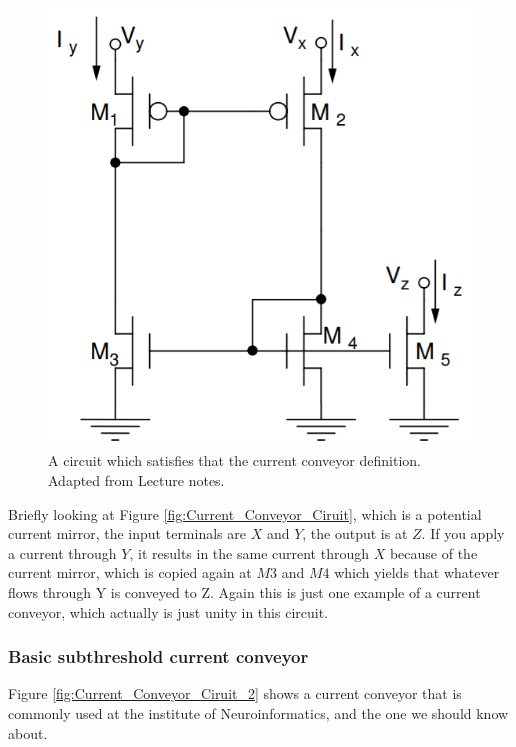 \begin{figure}[H]
    \centering
    \includegraphics[width=0.8\linewidth]{../../Figures/Current_Conveyor_Circuit.PNG}
    \caption{A circuit which satisfies that the current conveyor definition. Adapted from Lecture notes.}
    \label{fig:Current_Conveyor_Circuit}
\end{figure}

Briefly looking at Figure \ref{fig:Current_Conveyor_Ciruit}, which is a potential current mirror, the input terminals are $X$ and $Y$, the output is at $Z$. If you apply a current through $Y$, it results in the same current through $X$ because of the current mirror, which is copied again at $M3$ and $M4$ which yields that whatever flows through Y is conveyed to Z. Again this is just one example of a current conveyor, which actually is just unity in this circuit. 

\subsubsection{Basic subthreshold current conveyor}

Figure \ref{fig:Current_Conveyor_Ciruit_2} shows a current conveyor that is commonly used at the institute of Neuroinformatics, and the one we should know about. 

